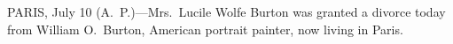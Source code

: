 
PARIS, July 10 (A.~P.)---Mrs.~Lucile Wolfe Burton was granted a
divorce today from William O.\ Burton, American portrait painter, now
living in Paris.
